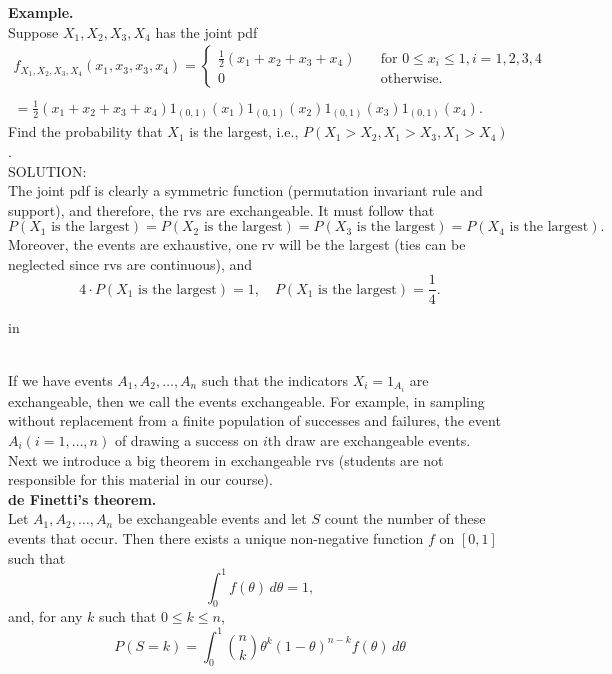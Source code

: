 \documentclass[12pt]{article}
\begin{document}
\noindent \textbf{Example.} \\
Suppose $X_1, X_2, X_3, X_4$ has the joint pdf
\begin{align*}
    f_{X_1, X_2, X_3, X_4}(x_1, x_3, x_3, x_4) = \left\{ \begin{array}{ll}
     \frac 12(x_1+x_2+x_3+x_4) & \quad \text{for } 0 \leq x_i \leq 1, i = 1,2,3,4 \\
     0 & \quad \text{otherwise.}
\end{array} \right. \\ \\
= \frac 12(x_1+x_2+x_3+x_4)1_{(0, 1)}(x_1)1_{(0, 1)}(x_2)1_{(0, 1)}(x_3)1_{(0, 1)}(x_4).
\end{align*}
Find the probability that $X_1$ is the largest, i.e., $P(X_1>X_2,X_1>X_3,X_1>X_4)$.\\

\noindent SOLUTION:\\
The joint pdf is clearly a symmetric function (permutation invariant rule and support), and therefore, the rvs are exchangeable.  It must follow that
$$P(X_1 \text{ is the largest}) = P(X_2 \text{ is the largest})= P(X_3 \text{ is the largest})= P(X_4 \text{ is the largest}).$$
Moreover, the events are exhaustive, one rv will be the largest (ties can be neglected since rvs are continuous), and
$$4 \cdot P(X_1 \text{ is the largest}) = 1, \quad P(X_1 \text{ is the largest}) = \frac{1}{4}.$$

 in

\label{exchangeableevents}\\
\noindent If we have events $A_1, A_2, \dots, A_n$ such that the indicators $X_i = 1_{A_i}$ are exchangeable, then we call the events exchangeable. For example, in sampling without replacement from a finite population of successes and failures, the event $A_i (i = 1, \dots, n)$ of drawing a success on $i$th draw are exchangeable events.\\

\noindent Next we introduce a big theorem in exchangeable rvs (students are not responsible for this material in our course).\\

\noindent \textbf{de Finetti's theorem.} \label{definettistheorem}\\
Let $A_1, A_2, \dots, A_n$ be exchangeable events and let $S$ count the number of these events that occur. Then there exists a unique non-negative function $f$ on $[0, 1]$ such that
$$\int_0^1 f(\theta) \,d\theta = 1,$$
and, for any $k$ such that $0 \leq k \leq n$,
$$P(S = k) = \int_0^1 \binom{n}{k} \theta^k(1-\theta)^{n-k} f(\theta) \,d\theta$$
\end{document}

